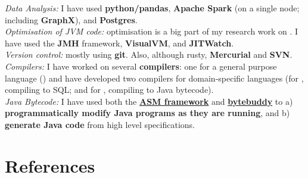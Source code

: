 \documentclass[10pt]{article} %
\begin{document}

 {

  \textit{Data Analysis:} I have used \textbf{python/pandas},
  \textbf{Apache Spark} (on a single node; including \textbf{GraphX}), and \textbf{Postgres}.\\
  \textit{Optimisation of JVM code:} optimisation is a big part of my research work on
  \secret{}. I have used the \textbf{JMH} framework, \textbf{VisualVM}, and \textbf{JITWatch}.\\
  \textit{Version control:} mostly using \textbf{git}. Also, although rusty,
  \textbf{Mercurial} and \textbf{SVN}.\\
  \textit{Compilers:} I have worked on several \textbf{compilers}: one for a
  general purpose language (\encore{}) and have developed two compilers for
  domain-specific languages (for \spencer{}, compiling to SQL; and for \secret{},
  compiling to
  Java bytecode). \\
  \textit{Java Bytecode:} I have used both the \textbf{\href{foo}{ASM
      framework}} and \textbf{\href{https://bytebuddy.net}{bytebuddy}} to a)
  \textbf{programmatically modify Java programs as they are running}, and b)
  \textbf{generate Java code} from high level specifications.}


\section{References}

\end{document}
